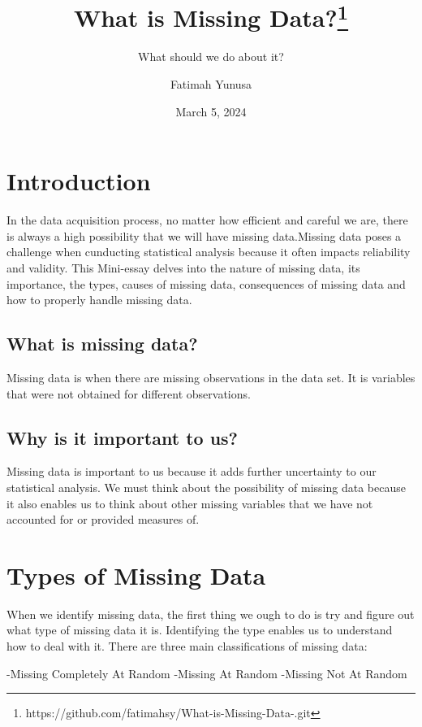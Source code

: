 \documentclass[
  letterpaper,
  DIV=11,
  numbers=noendperiod]{scrartcl}
\title{What is Missing
Data?\thanks{https://github.com/fatimahsy/What-is-Missing-Data-.git}}
\subtitle{What should we do about it?}
\author{Fatimah Yunusa}
\date{March 5, 2024}
\begin{document}
\maketitle

\section{Introduction}\label{introduction}

In the data acquisition process, no matter how efficient and careful we
are, there is always a high possibility that we will have missing
data.Missing data poses a challenge when cunducting statistical analysis
because it often impacts reliability and validity. This Mini-essay
delves into the nature of missing data, its importance, the types,
causes of missing data, consequences of missing data and how to properly
handle missing data.

\subsection{What is missing data?}\label{what-is-missing-data}

Missing data is when there are missing observations in the data set. It
is variables that were not obtained for different observations.

\subsection{Why is it important to us?}\label{why-is-it-important-to-us}

Missing data is important to us because it adds further uncertainty to
our statistical analysis. We must think about the possibility of missing
data because it also enables us to think about other missing variables
that we have not accounted for or provided measures of.

\section{Types of Missing Data}\label{types-of-missing-data}

When we identify missing data, the first thing we ough to do is try and
figure out what type of missing data it is. Identifying the type enables
us to understand how to deal with it. There are three main
classifications of missing data:

-Missing Completely At Random -Missing At Random -Missing Not At Random
\end{document}
